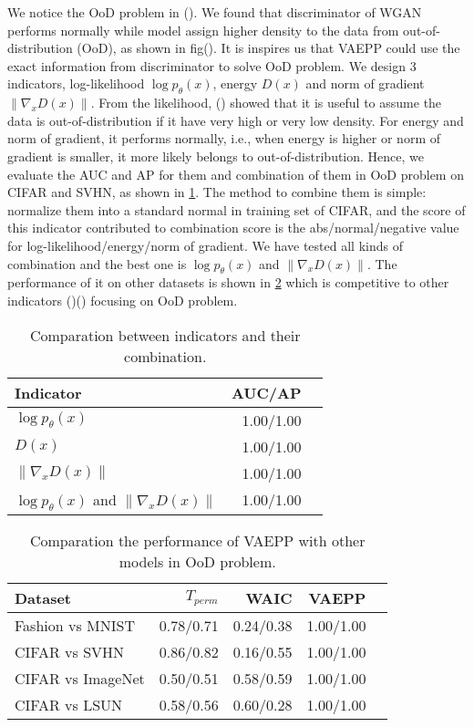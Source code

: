 We notice the OoD problem in (). We found that discriminator of WGAN performs normally while model assign higher density to the data from out-of-distribution (OoD), as shown in fig(). It is inspires us that VAEPP could use the exact information from discriminator to solve OoD problem. We design 3 indicators, log-likelihood $\log p_\theta(x)$, energy $D(x)$ and norm of gradient $\|\nabla_{x} D(x)\|$. From the likelihood, () showed that it is useful to assume the data is out-of-distribution if it have very high or very low density. For energy and norm of gradient, it performs normally, i.e., when energy is higher or norm of gradient is smaller, it more likely belongs to out-of-distribution. Hence, we evaluate the AUC and AP for them and combination of them in OoD problem on CIFAR and SVHN, as shown in \cref{tab:compare_ood}. The method to combine them is simple: normalize them into a standard normal in training set of CIFAR, and the score of this indicator contributed to combination score is the abs/normal/negative value for log-likelihood/energy/norm of gradient. We have tested all kinds of combination and the best one is $\log p_\theta(x)$ and $\|\nabla_x D(x)\|$. The performance of it on other datasets is shown in \cref{tab:compare_ood_other_datasets} which is competitive to other indicators ()() focusing on OoD problem. 
\begin{table}[tb]
\centering
\begin{tabular}{lrr}  
\toprule
Indicator  & AUC/AP \\
\midrule
$\log p_\theta(x)$   &  1.00/1.00      \\
$D(x)$               &  1.00/1.00      \\
$\|\nabla_x D(x)\|$  &  1.00/1.00      \\
$\log p_\theta(x)$ and $\|\nabla_x D(x)\|$ & 1.00/1.00 \\
\bottomrule
\end{tabular}
\caption{Comparation between indicators and their combination.}
\label{tab:compare_ood}
\end{table}

\begin{table}[tb]
\centering
\begin{tabular}{lrrrr}  
\toprule
Dataset  &  $T_{perm}$ & WAIC & VAEPP\\
\midrule
Fashion vs MNIST  & 0.78/0.71  & 0.24/0.38 & 1.00/1.00  \\
CIFAR vs SVHN     & 0.86/0.82  & 0.16/0.55 & 1.00/1.00  \\
CIFAR vs ImageNet & 0.50/0.51  & 0.58/0.59 & 1.00/1.00  \\
CIFAR vs LSUN     & 0.58/0.56  & 0.60/0.28 & 1.00/1.00  \\
\bottomrule
\end{tabular}
\caption{Comparation the performance of VAEPP with other models in OoD problem. }
\label{tab:compare_ood_other_datasets}
\end{table}

